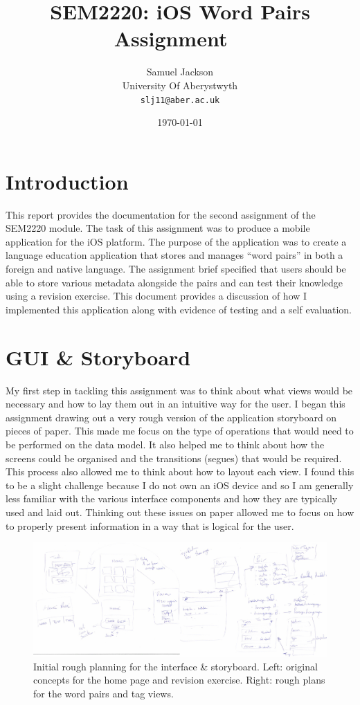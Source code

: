 \documentclass[paper=a4, fontsize=11pt]{scrartcl}	%
\title{
	\vspace{-0.5in} 	\usefont{OT1}{bch}{b}{n}
        SEM2220: iOS Word Pairs Assignment \
}
\author{
	\usefont{OT1}{bch}{m}{n} Samuel Jackson
	\\ \usefont{OT1}{bch}{m}{n} University Of Aberystwyth
	\\   \texttt{slj11@aber.ac.uk}
}
\date{\today}
\numberwithin{equation}{section}															%
\numberwithin{figure}{section}																%
\numberwithin{table}{section}
\begin{document}
\maketitle

\clearpage

\section{Introduction}
This report provides the documentation for the second assignment of the SEM2220 module. The task of this assignment was to produce a mobile application for the iOS platform. The purpose of the application was to create a language education application that stores and manages ``word pairs'' in both a foreign and native language. The assignment brief specified that users should be able to store various metadata alongside the pairs and can test their knowledge using a revision exercise. This document provides a discussion of how I implemented this application along with evidence of testing and a self evaluation. 

\section{GUI \& Storyboard}
My first step in tackling this assignment was to think about what views would be necessary and how to lay them out in an intuitive way for the user. I began this assignment drawing out a very rough version of the application storyboard on pieces of paper. This made me focus on the type of operations that would need to be performed on the data model. It also helped me to think about how the screens could be organised and the transitions (segues) that would be required. This process also allowed me to think about how to layout each view. I found this to be a slight challenge because I do not own an iOS device and so I am generally less familiar with the various interface components and how they are typically used and laid out. Thinking out these issues on paper allowed me to focus on how to properly present information in a way that is logical for the user.

\begin{figure}[H]
\centering
\includegraphics[width=1.0\textwidth]{img/planning.jpg}
\caption{Initial rough planning for the interface \& storyboard. Left: original concepts for the home page and revision exercise. Right: rough plans for the word pairs and tag views.}
\label{fig:planning}
\end{figure}
\end{document}

